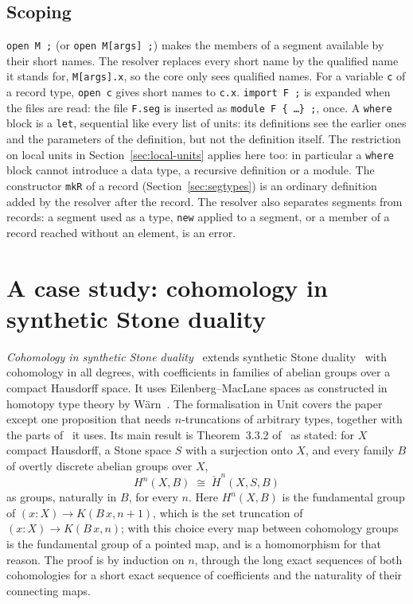 \documentclass[11pt]{article}
\newcommand{\sys}{\textsf{Unit}\xspace}
\newcommand{\kw}[1]{\texttt{#1}}
\theoremstyle{remark}
\begin{document}
\subsection{Scoping}
\kw{open M ;} (or \kw{open M[args] ;}) makes the members of a segment
available by their short names. The resolver replaces every short name by
the qualified name it stands for, \kw{M[args].x}, so the core only sees
qualified names. For a variable \kw{c} of a record type, \kw{open c} gives
short names to \kw{c.x}. \kw{import F ;} is expanded when the files are
read: the file \kw{F.seg} is inserted as \kw{module F \{ \dots \} ;}, once.
A \kw{where} block is a \kw{let}, sequential like every list of units:
its definitions see the earlier ones and the parameters of the
definition, but not the definition itself. The restriction on local units
in Section~\ref{sec:local-units} applies here too: in particular a
\kw{where} block cannot introduce a data type, a recursive definition or
a module. The constructor \kw{mkR} of a record
(Section~\ref{sec:segtypes}) is an ordinary definition added by the
resolver after the record. The resolver also separates segments from
records: a segment used as a type, \kw{new} applied to a segment, or a
member of a record reached without an element, is an error.

\section{A case study: cohomology in synthetic Stone duality}\label{sec:cca}

\emph{Cohomology in synthetic Stone duality}~\cite{CCA} extends
synthetic Stone duality~\cite{SSD} with cohomology in all degrees,
with coefficients in families of abelian groups over a compact
Hausdorff space. It uses Eilenberg--MacLane spaces as constructed in
homotopy type theory by W\"arn~\cite{DW1}. The formalisation in \sys
covers the paper except one proposition that needs $n$-truncations of
arbitrary types, together with the parts of~\cite{DW1} it uses. Its main
result is Theorem~3.3.2 of~\cite{CCA} as stated: for $X$ compact
Hausdorff, a Stone space $S$ with a surjection onto $X$, and every
family $B$ of overtly discrete abelian groups over $X$,
\[
  H^n(X,B)\;\cong\;\check H^n(X,S,B)
\]
as groups, naturally in $B$, for every $n$. Here $H^n(X,B)$ is the
fundamental group of $(x:X)\to K(B\,x,n+1)$, which is the set truncation
of $(x:X)\to K(B\,x,n)$; with this choice every map between cohomology
groups is the fundamental group of a pointed map, and is a homomorphism
for that reason. The proof is by induction on $n$, through the long
exact sequences of both cohomologies for a short exact sequence of
coefficients and the naturality of their connecting maps.
\end{document}
